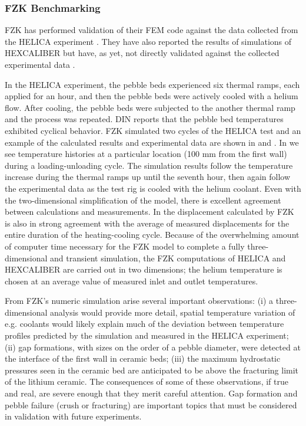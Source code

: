 \subsubsection{FZK Benchmarking}
FZK has performed validation of their FEM code against the data collected from the HELICA experiment \cite{Gan:2008kx}. They have also reported the results of simulations of HEXCALIBER but have, as yet, not directly validated against the collected experimental data \cite{Gan:2009vn}.

In the HELICA experiment, the pebble beds experienced six thermal ramps, each applied for an hour, and then the pebble beds were actively cooled with a helium flow. After cooling, the pebble beds were subjected to the another thermal ramp and the process was repeated. DIN reports\cite{dellorco:2006} that the pebble bed temperatures exhibited cyclical behavior. FZK simulated two cycles of the HELICA test and an example of the calculated results and experimental data are shown in  and . In  we see temperature histories at a particular location (100 mm from the first wall) during a loading-unloading cycle. The simulation results follow the temperature increase during the thermal ramps up until the seventh hour, then again follow the experimental data as the test rig is cooled with the helium coolant. Even with the two-dimensional simplification of the model, there is excellent agreement between calculations and measurements. In  the displacement calculated by FZK is also in strong agreement with the average of measured displacements for the entire duration of the heating-cooling cycle. Because of the overwhelming amount of computer time necessary for the FZK model to complete a fully three-dimensional and transient simulation, the FZK computations of HELICA and HEXCALIBER are carried out in two dimensions; the helium temperature is chosen at an average value of measured inlet and outlet temperatures.

From FZK's numeric simulation arise several important observations: (i) a three-dimensional analysis would provide more detail, spatial temperature variation of e.g. coolants would likely explain much of the deviation between temperature profiles predicted by the simulation and measured in the HELICA experiment; (ii) gap formations, with sizes on the order of a pebble diameter, were detected at the interface of the first wall in ceramic beds; (iii) the maximum hydrostatic pressures seen in the ceramic bed are anticipated to be above the fracturing limit of the lithium ceramic. The consequences of some of these observations, if true and real, are severe enough that they merit careful attention. Gap formation and pebble failure (crush or fracturing) are important topics that must be considered in validation with future experiments.

